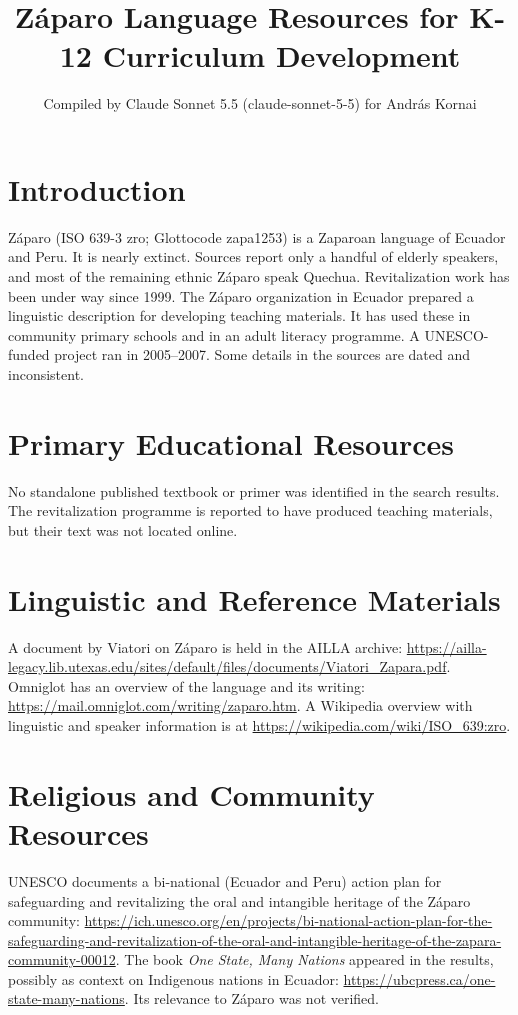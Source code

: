 \documentclass[12pt]{article}
\title{Z\'aparo Language Resources for K-12 Curriculum Development}
\author{Compiled by Claude Sonnet 5.5 (claude-sonnet-5-5) for Andr\'as Kornai}
\date{}
\begin{document}
\maketitle

\section{Introduction}
Z\'aparo (ISO 639-3 zro; Glottocode zapa1253) is a Zaparoan language of Ecuador and Peru. It is nearly extinct. Sources report only a handful of elderly speakers, and most of the remaining ethnic Z\'aparo speak Quechua. Revitalization work has been under way since 1999. The Z\'aparo organization in Ecuador prepared a linguistic description for developing teaching materials. It has used these in community primary schools and in an adult literacy programme. A UNESCO-funded project ran in 2005--2007. Some details in the sources are dated and inconsistent.

\section{Primary Educational Resources}
No standalone published textbook or primer was identified in the search results. The revitalization programme is reported to have produced teaching materials, but their text was not located online.

\section{Linguistic and Reference Materials}
A document by Viatori on Z\'aparo is held in the AILLA archive: \url{https://ailla-legacy.lib.utexas.edu/sites/default/files/documents/Viatori_Zapara.pdf}. Omniglot has an overview of the language and its writing: \url{https://mail.omniglot.com/writing/zaparo.htm}. A Wikipedia overview with linguistic and speaker information is at \url{https://wikipedia.com/wiki/ISO_639:zro}.

\section{Religious and Community Resources}
UNESCO documents a bi-national (Ecuador and Peru) action plan for safeguarding and revitalizing the oral and intangible heritage of the Z\'aparo community: \url{https://ich.unesco.org/en/projects/bi-national-action-plan-for-the-safeguarding-and-revitalization-of-the-oral-and-intangible-heritage-of-the-zapara-community-00012}. The book \emph{One State, Many Nations} appeared in the results, possibly as context on Indigenous nations in Ecuador: \url{https://ubcpress.ca/one-state-many-nations}. Its relevance to Z\'aparo was not verified.
\end{document}
